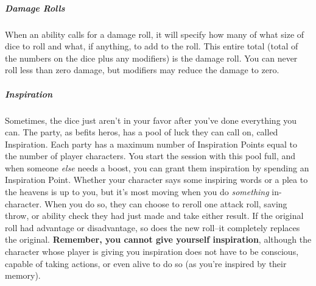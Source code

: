 \subparagraph*{Damage Rolls} When an ability calls for a damage roll, it will specify how many of what size of dice to roll and what, if anything, to add to the roll. This entire total (total of the numbers on the dice plus any modifiers) is the damage roll. You can never roll less than zero damage, but modifiers may reduce the damage to zero.

\subparagraph*{Inspiration} Sometimes, the dice just aren't in your favor after you've done everything you can. The party, as befits heros, has a pool of luck they can call on, called Inspiration. Each party has a maximum number of Inspiration Points equal to the number of player characters. You start the session with this pool full, and when someone \textit{else} needs a boost, you can grant them inspiration by spending an Inspiration Point. Whether your character says some inspiring words or a plea to the heavens is up to you, but it's most moving when you do \textit{something} in-character. When you do so, they can choose to reroll one attack roll, saving throw, or ability check they had just made and take either result. If the original roll had advantage or disadvantage, so does the new roll--it completely replaces the original. \textbf{Remember, you cannot give yourself inspiration}, although the character whose player is giving you inspiration does not have to be conscious, capable of taking actions, or even alive to do so (as you're inspired by their memory).
